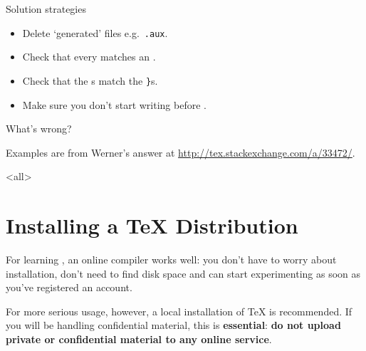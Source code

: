 \begin{frame}{Solution strategies}
	\begin{itemize}
		\item Delete ‘generated’ files e.g.\ \texttt{.aux}.
		\item Check that every  matches an .
		\item Check that the \textt{\{}s match the \texttt{\}}s.
		\item Make sure you don't start writing before .
	\end{itemize}

\end{frame}

\begin{exercise}
What's wrong?





Examples are from Werner's answer at \url{http://tex.stackexchange.com/a/33472/}.

\end{exercise}





\mode<all>
\mode*

\clearpage
\appendix

\section<1-| beamer:0>{Installing a \TeX{} Distribution}\label{sec:tex-distros}

For learning \LaTeXe{}, an online compiler works well: you don't have to worry about installation, don't need to find disk space and can start experimenting as soon as you've registered an account.

For more serious usage, however, a local installation of \TeX{} is recommended.
If you will be handling confidential material, this is \textbf{essential}: \textbf{do not upload private or confidential material to any online service}.

